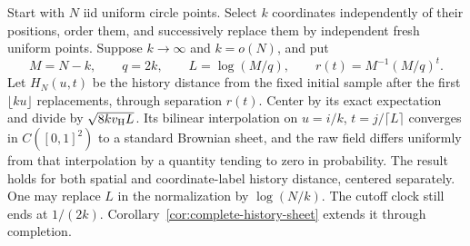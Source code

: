 \documentclass[11pt,letterpaper]{article}
\begin{document}
\begin{theorem}
\label{thm:resampling-history-sheet}
Start with $N$ iid uniform circle points. Select $k$ coordinates
independently of their positions, order them, and successively
replace them by independent fresh uniform points.
Suppose $k\to\infty$ and $k=o(N)$, and put
\[
 M=N-k,\qquad q=2k,\qquad L=\log(M/q),\qquad
 r(t)=M^{-1}(M/q)^t.
\]
Let $H_N(u,t)$ be the history distance from the fixed
initial sample after the first $\lfloor ku\rfloor$ replacements,
through separation $r(t)$.
Center by its exact expectation and divide by
$\sqrt{8kv_{\rm H}L}$.
Its bilinear interpolation on $u=i/k$, $t=j/\lceil L\rceil$
converges in $C([0,1]^2)$ to a standard Brownian sheet,
and the raw field differs uniformly from that interpolation
by a quantity tending to zero in probability.
The result holds for both spatial and coordinate-label
history distance, centered separately.
One may replace $L$ in the normalization by $\log(N/k)$.
The cutoff clock still ends at $1/(2k)$.
Corollary~\ref{cor:complete-history-sheet} extends it through completion.
\end{theorem}
\end{document}
